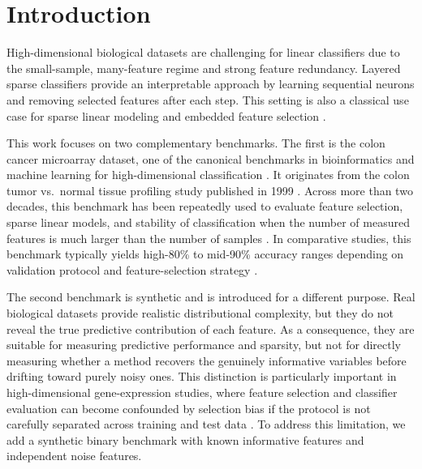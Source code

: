 \section*{Introduction}

High-dimensional biological datasets are challenging for linear classifiers due to the small-sample, many-feature
regime and strong feature redundancy. Layered sparse classifiers provide an interpretable approach by learning
sequential neurons and removing selected features after each step.
This setting is also a classical use case for sparse linear modeling and embedded feature selection
\cite{tibshirani1996lasso,ng2004l1l2,saeys2007review}.

This work focuses on two complementary benchmarks. The first is the colon cancer microarray dataset,
one of the canonical benchmarks in bioinformatics and machine learning for high-dimensional classification
\cite{alon1999,guyon2002,dudoit2002,li2004}. It originates from the colon tumor vs.\ normal tissue profiling
study published in 1999 \cite{alon1999}. Across more than two decades, this benchmark has been repeatedly used
to evaluate feature selection, sparse linear models, and stability of classification when the number of
measured features is much larger than the number of samples \cite{guyon2002,dudoit2002,li2004}. In comparative
studies, this benchmark
typically yields high-80\% to mid-90\% accuracy ranges depending on validation protocol and feature-selection
strategy \cite{guyon2002,dudoit2002,li2004}.

The second benchmark is synthetic and is introduced for a different purpose. Real biological datasets provide
realistic distributional complexity, but they do not reveal the true predictive contribution of each feature.
As a consequence, they are suitable for measuring predictive performance and sparsity, but not for directly
measuring whether a method recovers the genuinely informative variables before drifting toward purely noisy
ones. This distinction is particularly important in high-dimensional gene-expression studies,
where feature selection and classifier evaluation can become confounded by selection bias if the protocol is
not carefully separated across training and test data \cite{ambroise2002,krawczuk2016feature}. To address
this limitation, we add a synthetic binary benchmark with known informative features and independent noise
features.

